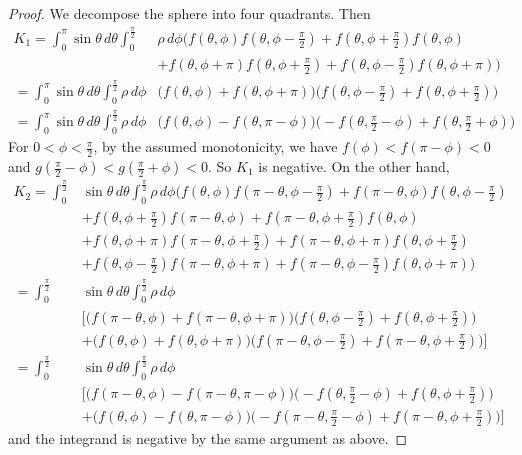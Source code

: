 \documentclass[a4paper]{amsart}
\theoremstyle{plain} %
\theoremstyle{definition} %
\theoremstyle{remark}
\begin{document}
\begin{proof}
	We decompose the sphere into four quadrants.  Then
	\begin{align*}
		K_1 = \int_0^\pi \sin\theta \, d\theta \int_{0}^{\tfrac{\pi}{2}} & \rho \, d\phi
		\big(f(\theta, \phi) f(\theta, \phi-\tfrac{\pi}{2}) + f(\theta, \phi+\tfrac{\pi}{2}) f(\theta, \phi)\\
		&+ f(\theta, \phi+\pi) f(\theta, \phi+\tfrac{\pi}{2}) + f(\theta, \phi-\tfrac{\pi}{2}) f(\theta, \phi+\pi) \big)\\
		= \int_0^\pi \sin\theta \, d\theta \int_{0}^{\tfrac{\pi}{2}} \rho \, d\phi
		& \big( f(\theta, \phi) + f(\theta, \phi + \pi) \big) \big( f(\theta, \phi - \tfrac{\pi}{2}) + f(\theta, \phi + \tfrac{\pi}{2}) \big)\\
		= \int_0^\pi \sin\theta \, d\theta \int_{0}^{\tfrac{\pi}{2}} \rho \, d\phi
		& \big( f(\theta, \phi) - f(\theta, \pi - \phi) \big) \big(-f(\theta, \tfrac{\pi}{2} - \phi) + f(\theta, \tfrac{\pi}{2} + \phi) \big)
	\end{align*}
	For $0 < \phi < \tfrac{\pi}{2}$, by the assumed monotonicity, we have $f(\phi) < f(\pi
	- \phi) < 0$ and $g(\tfrac{\pi}{2}-\phi) < g(\tfrac{\pi}{2} + \phi) < 0$.  So $K_1$ is
	negative.  On the other hand,
	\begin{align*}
		K_2 = \int_0^{\tfrac{\pi}{2}} & \sin\theta \, d\theta \int_{0}^{\tfrac{\pi}{2}} \rho \, d\phi \big(
			f(\theta, \phi) f(\pi - \theta, \phi-\tfrac{\pi}{2}) + f(\pi - \theta, \phi) f(\theta, \phi-\tfrac{\pi}{2})\\
			&+f(\theta, \phi+\tfrac{\pi}{2}) f(\pi - \theta, \phi) + f(\pi - \theta, \phi+\tfrac{\pi}{2}) f(\theta, \phi)\\
			&+f(\theta, \phi+\pi) f(\pi - \theta, \phi+\tfrac{\pi}{2}) + f(\pi - \theta, \phi+\pi) f(\theta, \phi+\tfrac{\pi}{2})\\
			&+f(\theta, \phi-\tfrac{\pi}{2}) f(\pi - \theta, \phi+\pi) + f(\pi - \theta, \phi-\tfrac{\pi}{2}) f(\theta, \phi+\pi)
		\big)\\
		= \int_0^{\tfrac{\pi}{2}} & \sin\theta \, d\theta \int_{0}^{\tfrac{\pi}{2}} \rho \, d\phi \\ & \Big[
			\big(f(\pi - \theta, \phi) + f(\pi - \theta, \phi + \pi) \big) \big( f(\theta, \phi - \tfrac{\pi}{2}) + f(\theta, \phi + \tfrac{\pi}{2}) \big) \\
			&+\big(f(\theta, \phi) + f(\theta, \phi + \pi) \big) \big( f(\pi - \theta, \phi - \tfrac{\pi}{2}) + f(\pi - \theta, \phi + \tfrac{\pi}{2}) \big) 
		\Big] \\
		= \int_0^{\tfrac{\pi}{2}} & \sin\theta \, d\theta \int_{0}^{\tfrac{\pi}{2}}\rho \, d\phi \\ & \Big[
			\big(f(\pi - \theta, \phi) - f(\pi - \theta, \pi - \phi) \big) \big( -f(\theta, \tfrac{\pi}{2} - \phi) + f(\theta, \phi + \tfrac{\pi}{2}) \big) \\
			&+\big(f(\theta, \phi) - f(\theta, \pi - \phi) \big) \big( -f(\pi - \theta, \tfrac{\pi}{2} - \phi) + f(\pi - \theta, \phi + \tfrac{\pi}{2}) \big) 
		\Big]
	\end{align*}
	and the integrand is negative by the same argument as above.


\end{proof}
\end{document}

